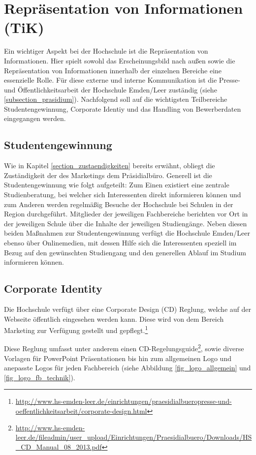 \section{Repräsentation von Informationen (TiK)}
Ein wichtiger Aspekt bei der Hochschule ist die Repräsentation von Informationen. Hier spielt sowohl das Erscheinungsbild nach außen sowie die Repräsentation von Informationen innerhalb der einzelnen Bereiche eine essenzielle Rolle. Für diese externe und interne Kommunikation ist die Presse- und Öffentlichkeitsarbeit der Hochschule Emden/Leer zuständig (siehe \ref{subsection_prasidium}). Nachfolgend soll auf die wichtigsten Teilbereiche Studentengewinnung, Corporate Identiy und das Handling von Bewerberdaten eingegangen werden.

\subsection{Studentengewinnung}
Wie in Kapitel \ref{section_zustaendigkeiten} bereits erwähnt, obliegt die Zuständigkeit der des Marketings dem Präsidialbüro. Generell ist die Studentengewinnung wie folgt aufgeteilt: Zum Einen existiert eine zentrale Studienberatung, bei welcher sich Interessenten direkt informieren können und zum Anderen werden regelmäßig Besuche der Hochschule bei Schulen in der Region durchgeführt. Mitglieder der jeweiligen Fachbereiche berichten vor Ort in der jeweiligen Schule über die Inhalte der jeweiligen Studiengänge. Neben diesen beiden Maßnahmen zur Studentengewinnung verfügt die Hochschule Emden/Leer ebenso über Onlinemedien, mit dessen Hilfe sich die Interessenten speziell im Bezug auf den gewünschten Studiengang und den generellen Ablauf im Studium informieren können.

\subsection{Corporate Identity}
Die Hochschule verfügt über eine Corporate Design (CD) Reglung, welche auf der Webseite öffentlich eingesehen werden kann. Diese wird von dem Bereich Marketing zur Verfügung gestellt und gepflegt.\footnote{\url{http://www.hs-emden-leer.de/einrichtungen/praesidialbueropresse-und-oeffentlichkeitsarbeit/corporate-design.html}}

Diese Reglung umfasst unter anderem einen CD-Regelungsguide\footnote{\url{http://www.hs-emden-leer.de/fileadmin/user_upload/Einrichtungen/Praesidialbuero/Downloads/HS_CD_Manual_08_2013.pdf}}, sowie diverse Vorlagen für PowerPoint Präsentationen bis hin zum allgemeinen Logo und anepasste Logos für jeden Fachbereich (siehe Abbildung \ref{fig_logo_allgemein} und \ref{fig_logo_fb_technik}).


